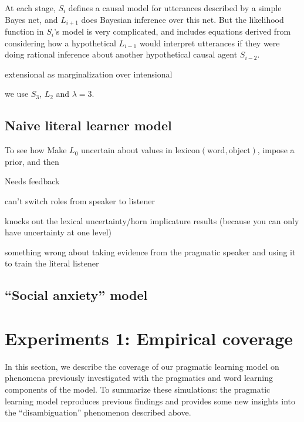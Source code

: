 \documentclass{article} %
\newcommand{\word}{\text{word}}
\newcommand{\obj}{\text{object}}
\newcommand{\lex}{\text{lexicon}}
\begin{document}
At each stage, $S_i$ defines a causal model for utterances described
by a simple Bayes net, and $L_{i+1}$ does Bayesian inference over this net. But the likelihood function in $S_i$'s model is very complicated, and includes equations derived from considering how a hypothetical $L_{i-1}$ would interpret utterances if they were doing rational inference about another hypothetical causal agent $S_{i-2}$.

extensional as marginalization over intensional


we use $S_3$, $L_2$ and $\lambda = 3$.

\subsection{Naive literal learner model}



To see how
Make $L_0$ uncertain about values in $\lex(\word, \obj)$, impose a prior, and then

Needs feedback

can't switch roles from speaker to listener

knocks out the lexical uncertainty/horn implicature results (because you can only have uncertainty at one level)

something wrong about taking evidence from the pragmatic speaker and using it to train the literal listener

\subsection{``Social anxiety'' model}

\section{Experiments 1: Empirical coverage}

In this section, we describe the coverage of our pragmatic learning model on phenomena previously investigated with the pragmatics and word learning components of the model. To summarize these simulations: the pragmatic learning model reproduces previous findings and provides some new insights into the ``disambiguation'' phenomenon described above. 
\end{document}
